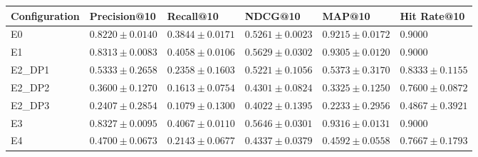 \begin{tabular}{llllll}
\toprule
Configuration & Precision@10 & Recall@10 & NDCG@10 & MAP@10 & Hit Rate@10 \\
\midrule
E0 & $0.8220 \pm 0.0140$ & $0.3844 \pm 0.0171$ & $0.5261 \pm 0.0023$ & $0.9215 \pm 0.0172$ & 0.9000 \\
E1 & $0.8313 \pm 0.0083$ & $0.4058 \pm 0.0106$ & $0.5629 \pm 0.0302$ & $0.9305 \pm 0.0120$ & 0.9000 \\
E2_DP1 & $0.5333 \pm 0.2658$ & $0.2358 \pm 0.1603$ & $0.5221 \pm 0.1056$ & $0.5373 \pm 0.3170$ & $0.8333 \pm 0.1155$ \\
E2_DP2 & $0.3600 \pm 0.1270$ & $0.1613 \pm 0.0754$ & $0.4301 \pm 0.0824$ & $0.3325 \pm 0.1250$ & $0.7600 \pm 0.0872$ \\
E2_DP3 & $0.2407 \pm 0.2854$ & $0.1079 \pm 0.1300$ & $0.4022 \pm 0.1395$ & $0.2233 \pm 0.2956$ & $0.4867 \pm 0.3921$ \\
E3 & $0.8327 \pm 0.0095$ & $0.4067 \pm 0.0110$ & $0.5646 \pm 0.0301$ & $0.9316 \pm 0.0131$ & 0.9000 \\
E4 & $0.4700 \pm 0.0673$ & $0.2143 \pm 0.0677$ & $0.4337 \pm 0.0379$ & $0.4592 \pm 0.0558$ & $0.7667 \pm 0.1793$ \\
\bottomrule
\end{tabular}
